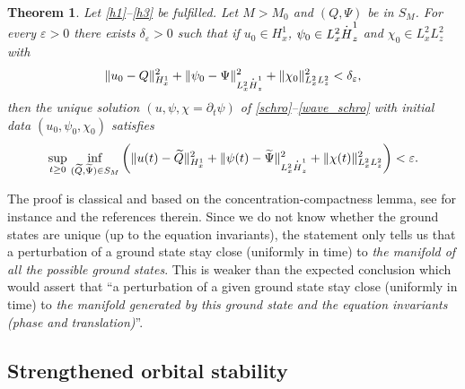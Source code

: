 \documentclass[11pt]{article}
\DeclareRobustCommand{\accentset}[2]{\overset{#1}{#2}}
\newtheorem{theo}[lemma]{Theorem}
\theoremstyle{definition}
\newcommand*{\overbigdot}[1]{%
\accentset{\mbox{\large\bfseries .}}{#1}}
\begin{document}
\begin{theo}\label{orbital_stab_1}
Let \eqref{h1}--\eqref{h3} be fulfilled. Let $M>M_{0}$ and $(Q,\Psi)$ be in $S_{M}$. For every $\varepsilon>0$ there exists $\delta_{\varepsilon}>0$ such that if $u_{0}\in H_{x}^{1}$, $\psi_{0}\in L_{x}^{2}\overbigdot{H}_{z}^{1}$ and $\chi_{0}\in L_{x}^{2}L_{z}^{2}$ with
\[
\|u_{0}-Q\|_{H_{x}^{1}}^{2}+\|\psi_{0}-\Psi\|_{L_{x}^{2}\overbigdot{H}_{z}^{1}}^{2}+\|\chi_{0}\|_{L_{x}^{2}L_{z}^{2}}^{2}<\delta_{\varepsilon},
\]
then the unique solution $(u,\psi,\chi=\partial_t\psi)$ of \eqref{schro}--\eqref{wave_schro} with initial data $(u_{0},\psi_{0},\chi_{0})$ satisfies
\[
\underset{t\geq 0}{\sup}\;\underset{(\widetilde{Q},\widetilde{\Psi})\in S_{M}}{\inf}\left(\|u(t)-\widetilde{Q}\|_{H_{x}^{1}}^{2}+\|\psi(t)-\widetilde{\Psi}\|_{L_{x}^{2}\overbigdot{H}_{z}^{1}}^{2}+\|\chi(t)\|_{L_{x}^{2}L_{z}^{2}}^{2}\right)<\varepsilon.
\]
\end{theo}
The proof is classical and based on the concentration-compactness lemma, see for instance \cite{Cazenave_Lions_orbital_stab, PLLcc1, PLLcc2} and the references therein.
Since we do not know whether the ground states are unique (up to the equation invariants),
the statement
only tells us that a perturbation of a ground state stay close (uniformly in time) to \emph{the manifold of all the possible ground states}.
This is weaker than the
expected conclusion which would assert that ``a perturbation of a given ground state stay close (uniformly in time) to \emph{the manifold generated by this ground state and the equation invariants (phase and translation)}''.

\subsection{Strengthened orbital stability}
\end{document}
